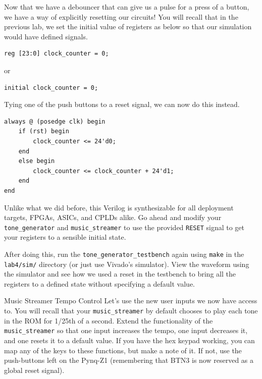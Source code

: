 \documentclass[11pt]{article}
\makeatletter
\renewcommand{\section}
{\@startsection {section}{1}{0pt}
 {-2ex}
 {1ex}
 {\bfseries\Large}}
\makeatother
\begin{document}
Now that we have a debouncer that can give us a pulse for a press of a button, we have a way of explicitly resetting our circuits! You will recall that in the previous lab, we set the initial value of registers as below so that our simulation would have defined signals.

\begin{verbatim}
reg [23:0] clock_counter = 0;
\end{verbatim}

or 

\begin{verbatim}
initial clock_counter = 0;
\end{verbatim}

Tying one of the push buttons to a reset signal, we can now do this instead.

\begin{verbatim}
always @ (posedge clk) begin
	if (rst) begin
		clock_counter <= 24'd0;
	end
	else begin
		clock_counter <= clock_counter + 24'd1;
	end
end
\end{verbatim}

Unlike what we did before, this Verilog is synthesizable for all deployment targets, FPGAs, ASICs, and CPLDs alike. Go ahead and modify your \verb|tone_generator| and \verb|music_streamer| to use the provided \verb|RESET| signal to get your registers to a sensible initial state.

After doing this, run the \verb|tone_generator_testbench| again using \verb|make| in the \verb|lab4/sim/| directory (or just use Vivado's simulator). View the waveform using the simulator and see how we used a reset in the testbench to bring all the registers to a defined state without specifying a default value.

\section{Music Streamer Tempo Control}
Let's use the new user inputs we now have access to. You will recall that your \verb|music_streamer| by default chooses to play each tone in the ROM for 1/25th of a second. Extend the functionality of the \verb|music_streamer| so that one input increases the tempo, one input decreases it, and one resets it to a default value. If you have the hex keypad working, you can map any of the keys to these functions, but make a note of it. If not, use the push-buttons left on the Pynq-Z1 (remembering that BTN3 is now reserved as a global reset signal).
\end{document}
